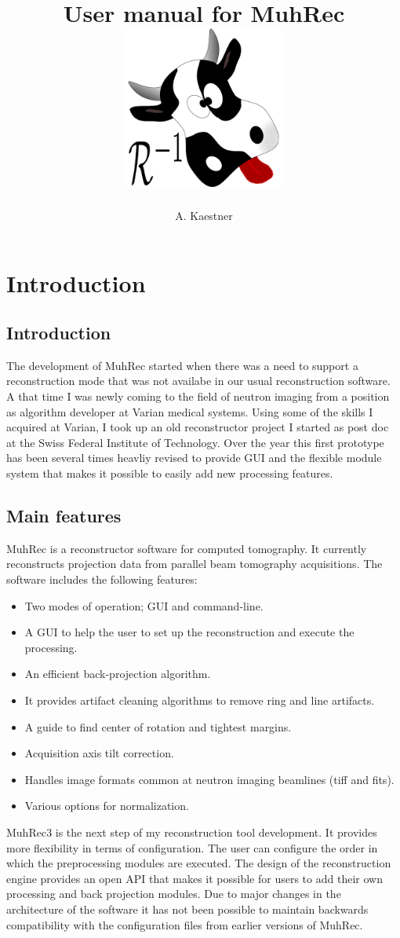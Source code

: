 \documentclass[a4paper]{scrreprt}
\title{User manual for MuhRec\\\vskip30pt\includegraphics[width=0.4\textwidth]{figures/muh_icon.pdf}}
\author{A. Kaestner}
\begin{document}
\maketitle
\tableofcontents
\chapter{Introduction}
\section{Introduction}
The development of MuhRec started when there was a need to support a reconstruction mode that was not availabe in our usual reconstruction software. A that time I was newly coming to the field of neutron imaging from a position as algorithm developer at Varian medical systems. Using some of the skills I acquired at Varian, I took up an old reconstructor project I started as post doc at the Swiss Federal Institute of Technology. Over the year this first prototype has been several times heavliy revised to provide GUI and the flexible module system that makes it possible to easily add new processing features. 

\section{Main features}
MuhRec is a reconstructor software for computed tomography. It currently reconstructs projection data from parallel beam tomography acquisitions. The software includes the following features:
\begin{itemize}
\item Two modes of operation; GUI and command-line.
\item A GUI to help the user to set up the reconstruction and execute the processing.
\item An efficient back-projection algorithm. 
\item It provides artifact cleaning algorithms to remove ring and line artifacts.
\item A guide to find center of rotation and tightest margins.
\item Acquisition axis tilt correction.
\item Handles image formats common at neutron imaging beamlines (tiff and fits).
\item Various options for normalization.
\end{itemize}

MuhRec3 is the next step of my reconstruction tool development. It provides more flexibility in terms of configuration. The user can configure the order in which the preprocessing modules are executed. The design of the reconstruction engine provides an open API that makes it possible for users to add their own processing and back projection modules. Due to major changes in the architecture of the software it has not been possible to maintain backwards compatibility with the configuration files from earlier versions of MuhRec. 
\end{document}
